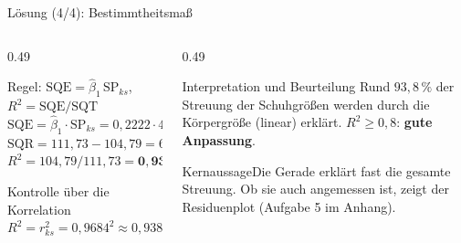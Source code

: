 \documentclass[aspectratio=169,11pt]{beamer}
\newcommand{\kernaussage}[1]{\begin{alertblock}{Kernaussage}#1\end{alertblock}}
\newcommand{\SPks}{\text{SP}_{ks}}
\begin{document}
\begin{frame}{Lösung (4/4): Bestimmtheitsmaß}
  \begin{columns}[T]
    \begin{column}{0.49\textwidth}
      \begin{block}{Regel: $\text{SQE} = \hat{\beta}_1\,\SPks$, \ $R^{2} = \text{SQE}/\text{SQT}$}
        $\text{SQE} = \hat{\beta}_1 \cdot \SPks = 0{,}2222 \cdot 471{,}6 = 104{,}79$\\[3pt]
        $\text{SQR} = 111{,}73 - 104{,}79 = 6{,}94$\\[3pt]
        $R^{2} = 104{,}79 / 111{,}73 = \mathbf{0{,}9379}$
      \end{block}
      \begin{block}{Kontrolle über die Korrelation}
        $R^{2} = r_{ks}^{2} = 0{,}9684^{2} \approx 0{,}938$ \checkmark
      \end{block}
    \end{column}
    \begin{column}{0.49\textwidth}
      \begin{exampleblock}{Interpretation und Beurteilung}
        Rund $93{,}8\,\%$ der Streuung der Schuhgrößen werden durch die
        Körpergröße (linear) erklärt. $R^{2} \ge 0{,}8$: \textbf{gute Anpassung}.
      \end{exampleblock}
      \kernaussage{Die Gerade erklärt fast die gesamte Streuung. Ob sie auch
        angemessen ist, zeigt der Residuenplot (Aufgabe 5 im Anhang).}
    \end{column}
  \end{columns}
\end{frame}

\end{document}
